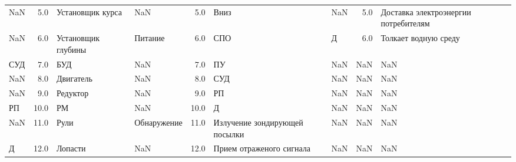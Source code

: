 \begin{longtable}{lrllrllrl}
                                   NaN &         5.0 &                             Установщик курса &                                      NaN &         5.0 &                              Вниз &                                       NaN &         5.0 &  Доставка электроэнергии потребителям \\
                                   NaN &         6.0 &                           Установщик глубины &                                  Питание &         6.0 &                               СПО &                                         Д &         6.0 &                  Толкает водную среду \\
                                   СУД &         7.0 &                                          БУД &                                      NaN &         7.0 &                                ПУ &                                       NaN &         NaN &                                   NaN \\
                                   NaN &         8.0 &                                    Двигатель &                                      NaN &         8.0 &                               СУД &                                       NaN &         NaN &                                   NaN \\
                                   NaN &         9.0 &                                     Редуктор &                                      NaN &         9.0 &                                РП &                                       NaN &         NaN &                                   NaN \\
                                    РП &        10.0 &                                           РМ &                                      NaN &        10.0 &                                 Д &                                       NaN &         NaN &                                   NaN \\
                                   NaN &        11.0 &                                         Рули &                              Обнаружение &        11.0 &     Излучение зондирующей посылки &                                       NaN &         NaN &                                   NaN \\
                                     Д &        12.0 &                                      Лопасти &                                      NaN &        12.0 &          Прием отраженого сигнала &                                       NaN &         NaN &                                   NaN \\

\end{longtable}
